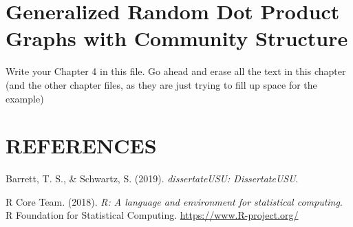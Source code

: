 \documentclass{DissertateUSU}
\newenvironment{CSLReferences}%
  {}%
  {\par}
\begin{document}
\lipsum

\FloatBarrier
\newpage
\fancyhead[R]{\thepage}
\fancyfoot[C]{}

\chapter{Generalized Random Dot Product Graphs with Community Structure}

\doublespacing

Write your Chapter 4 in this file. Go ahead and erase all the text in
this chapter (and the other chapter files, as they are just trying to
fill up space for the example)

\lipsum

\FloatBarrier
\newpage
\fancyhead[R]{\thepage}
\fancyfoot[C]{}

\chapter*{REFERENCES}

\setlength{\parindent}{-0.5in}
\setlength{\leftskip}{0.4in}
\setlength{\parskip}{6pt}

\noindent

\hypertarget{refs}{}
\begin{CSLReferences}{1}{0}
\leavevmode{}%
Barrett, T. S., \& Schwartz, S. (2019). \emph{dissertateUSU:
DissertateUSU}.

\leavevmode{}%
R Core Team. (2018). \emph{R: A language and environment for statistical
computing}. R Foundation for Statistical Computing.
\url{https://www.R-project.org/}

\end{CSLReferences}

\end{document}
